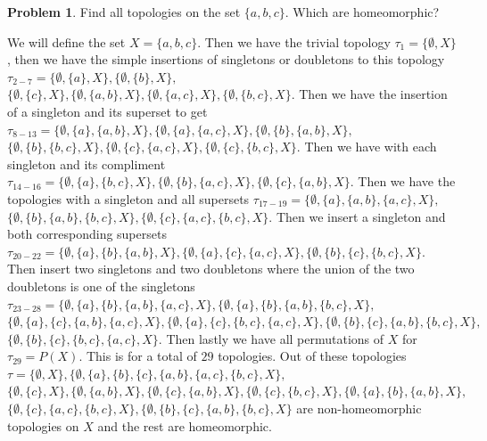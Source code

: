 \documentclass[11pt]{article}
\theoremstyle{definition}
\newtheorem{problem}{Problem}
\begin{document}
\begin{problem}
    Find all topologies on the set $\{a, b, c\}.$ Which are homeomorphic?
\end{problem}
We will define the set $X = \{a, b, c\}$. Then we have the trivial topology $\tau_1 = \{\emptyset, X\}$, then we have the simple insertions of singletons or doubletons to this topology $\tau_{2-7} = \{\emptyset, \{a\}, X\}, \{\emptyset, \{b\}, X\},$ $\{\emptyset, \{c\}, X\}, \{\emptyset, \{a, b\}, X\}, \{\emptyset, \{a, c\}, X\}, \{\emptyset, \{b, c\}, X\}$. Then we have the insertion of a singleton and its superset to get $\tau_{8 - 13} = \{\emptyset, \{a\}, \{a, b\}, X\}, \{\emptyset, \{a\}, \{a, c\}, X\}, \{\emptyset, \{b\}, \{a, b\}, X\},$\\ $\{\emptyset, \{b\}, \{b, c\}, X\}, \{\emptyset, \{c\}, \{a, c\}, X\}, \{\emptyset, \{c\}, \{b, c\}, X\}$. Then we have with each singleton and its compliment $\tau_{14-16} = \{\emptyset, \{a\}, \{b, c\}, X\}, \{\emptyset, \{b\}, \{a, c\}, X\}, \{\emptyset, \{c\}, \{a, b\}, X\}$. Then we have the topologies with a singleton and all supersets $\tau_{17 - 19} = \{\emptyset, \{a\}, \{a, b\}, \{a, c\}, X\},$\\ $\{\emptyset, \{b\}, \{a, b\}, \{b, c\}, X\}, \{\emptyset, \{c\}, \{a, c\}, \{b, c\}, X\}$. Then we insert a singleton and both corresponding supersets $\tau_{20 - 22} = \{\emptyset, \{a\}, \{b\}, \{a, b\}, X\}, \{\emptyset, \{a\}, \{c\}, \{a, c\}, X\}, \{\emptyset, \{b\}, \{c\}, \{b, c\}, X\}$. Then insert two singletons and two doubletons where the union of the two doubletons is one of the singletons $\tau_{23 - 28} = \{\emptyset, \{a\}, \{b\}, \{a, b\}, \{a, c\}, X\}, \{\emptyset, \{a\}, \{b\}, \{a, b\}, \{b, c\}, X\},$\\ $\{\emptyset, \{a\}, \{c\}, \{a, b\}, \{a, c\}, X\}, \{\emptyset, \{a\}, \{c\}, \{b, c\}, \{a, c\}, X\}, \{\emptyset, \{b\}, \{c\}, \{a, b\}, \{b, c\}, X\},$\\ $\{\emptyset, \{b\}, \{c\}, \{b, c\}, \{a, c\}, X\}$. Then lastly we have all permutations of $X$ for $\tau_{29} = P(X)$. This is for a total of $29$ topologies. Out of these topologies $\tau = \{\emptyset, X\}, \{\emptyset, \{a\}, \{b\}, \{c\}, \{a, b\}, \{a, c\}, \{b, c\}, X\},$\\ $\{\emptyset, \{c\}, X\}, \{\emptyset, \{a, b\}, X\}, \{\emptyset, \{c\}, \{a, b\}, X\}, \{\emptyset, \{c\}, \{b, c\}, X\}, \{\emptyset, \{a\}, \{b\}, \{a, b\}, X\},$\\$\{\emptyset, \{c\}, \{a, c\}, \{b, c\}, X\}, \{\emptyset, \{b\}, \{c\}, \{a, b\}, \{b, c\}, X\}$ are non-homeomorphic topologies on $X$ and the rest are homeomorphic.
\end{document}
